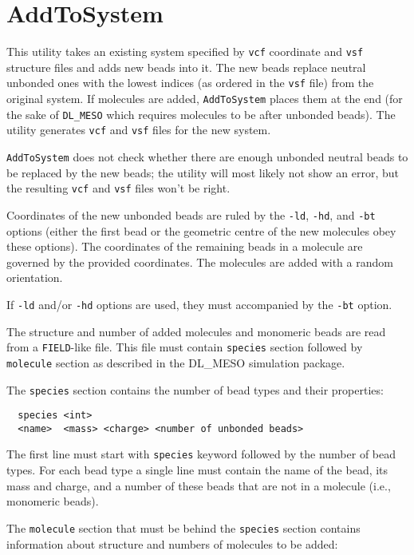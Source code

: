 \section{AddToSystem} \label{sec:AddToSystem}

This utility takes an existing system specified by \texttt{vcf} coordinate
and \texttt{vsf} structure files and adds new beads into it. The new beads
replace neutral unbonded ones with the lowest indices (as ordered in the
\texttt{vsf} file) from the original system. If molecules are added,
\texttt{AddToSystem} places them at the end (for the sake of
\texttt{DL\_MESO} which requires molecules to be after unbonded beads). The
utility generates \texttt{vcf} and \texttt{vsf} files for the new system.

\texttt{AddToSystem} does not check whether there are enough unbonded
neutral beads to be replaced by the new beads; the utility will most likely
not show an error, but the resulting \texttt{vcf} and \texttt{vsf} files
won't be right.

Coordinates of the new unbonded beads are ruled by the \texttt{-ld},
\texttt{-hd}, and \texttt{-bt} options (either the first bead or the
geometric centre of the new molecules obey these options). The coordinates
of the remaining beads in a molecule are governed by the provided
coordinates. The molecules are added with a random orientation.

If \texttt{-ld} and/or \texttt{-hd} options are used, they must accompanied
by the \texttt{-bt} option.

The structure and number of added molecules and monomeric beads are read
from a \texttt{FIELD}-like file. This file must contain \texttt{species}
section followed by \texttt{molecule} section as described in the DL\_MESO
simulation package.

The \texttt{species} section contains the number of bead types and their
properties:
\begin{verbatim}
  species <int>
  <name>  <mass> <charge> <number of unbonded beads>
\end{verbatim}
The first line must start with \texttt{species} keyword followed by the
number of bead types. For each bead type a single line must contain the name of
the bead, its mass and charge, and a number of these beads that are not
in a molecule (i.e., monomeric beads).

The \texttt{molecule} section that must be behind the \texttt{species}
section contains information about structure and numbers of molecules to be
added:

